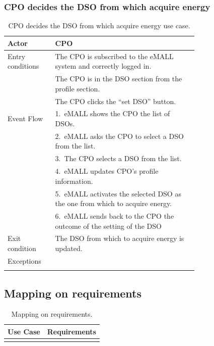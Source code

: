 \subsubsection*{CPO decides the DSO from which acquire energy}
\begin{center}
    \begin{longtable}{lp{0.75\linewidth}}
        \hline
        Actor            & CPO                                                                           \\
        \hline
        Entry conditions & The CPO is subscribed to the eMALL system and correctly logged in.            \\
        & The CPO is in the DSO section from the profile section.                       \\
        & The CPO clicks the “set DSO” button.                                          \\
        \hline
        Event Flow       & 1.\ eMALL shows the CPO the list of DSOs.                                     \\
        & 2.\ eMALL asks the CPO to select a DSO from the list.                         \\
        & 3.\ The CPO selects a DSO from the list.                                      \\
        & 4.\ eMALL updates CPO’s profile information.                                  \\
        & 5.\ eMALL activates the selected DSO as the one from which to acquire energy. \\
        & 6.\ eMALL sends back to the CPO the outcome of the setting of the DSO         \\
        \hline
        Exit condition   & The DSO from which to acquire energy is updated.                              \\
        \hline
        Exceptions       &                                                                               \\
        \hline
        \caption{CPO decides the DSO from which acquire energy use case.}
        \label{tab: CPO_decides_DSO_use_case}
    \end{longtable}
\end{center}

\subsection{Mapping on requirements}
\label{subsec: map_on_req}%
\setcounter{mr}{1}
\newcommand{\cmr}{\themr\stepcounter{mr}}
\begin{center}
    \begin{longtable}{|l|l|}
        \hline
        \textbf{Use Case} & \textbf{Requirements} \\
        \hline
        \caption{Mapping on requirements.}
        \label{tab: map_on_req}
    \end{longtable}
\end{center}



